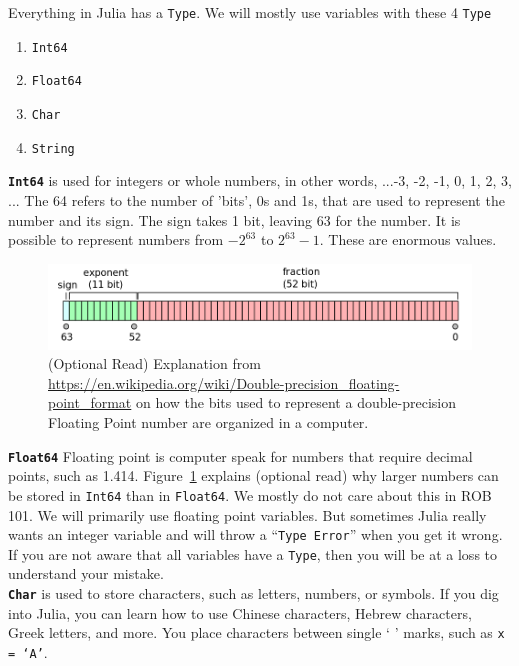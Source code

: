 Everything in Julia has a \texttt{Type}. We will mostly use variables with these 4 \texttt{Type}
\begin{enumerate}
        \renewcommand{\labelenumi}{(\alph{enumi})}
        \setlength{\itemsep}{.1cm}
    \item \texttt{Int64}
    \item \texttt{Float64}
    \item \texttt{Char}
    \item \texttt{String}
\end{enumerate}

\texttt{\bf Int64} is used for integers or whole numbers, in other words, ...-3, -2, -1, 0, 1, 2, 3, ... The 64 refers to the number of 'bits', 0s and 1s, that are used to represent the number and its sign. The sign takes 1 bit, leaving 63 for the number. It is possible to represent numbers from $-2^{63}$ to $2^{63} - 1$. These are enormous values.\\

    
   \begin{figure}[hbt!]%
	\centering
\includegraphics[width=0.75\columnwidth]{graphics/Chap02/FloatingPoint.png}
    \caption[]{ (Optional Read) Explanation from \url{https://en.wikipedia.org/wiki/Double-precision_floating-point_format} on how the bits used to represent a double-precision Floating Point number are organized in a computer.}
    \label{fig:FloatingPoint}
\end{figure} 


\texttt{\bf Float64} Floating point is computer speak for numbers that require decimal points, such as 1.414. Figure~\ref{fig:FloatingPoint} explains (optional read) why larger numbers can be stored in \texttt{Int64} than in \texttt{Float64}. We mostly do not care about this in ROB 101. We will primarily use floating point variables. But sometimes Julia really wants an integer variable and will throw a ``\texttt{Type Error}'' when you get it wrong. If you are not aware that all variables have a \texttt{Type}, then you will be at a loss to understand your mistake. \\

\texttt{\bf Char} is used to store characters, such as letters, numbers, or symbols. If you dig into Julia, you can learn how to use Chinese characters, Hebrew characters, Greek letters, and more. You place characters between single ` \hspace*{.3cm} ' marks, such as \texttt{x = `A'}.\\


